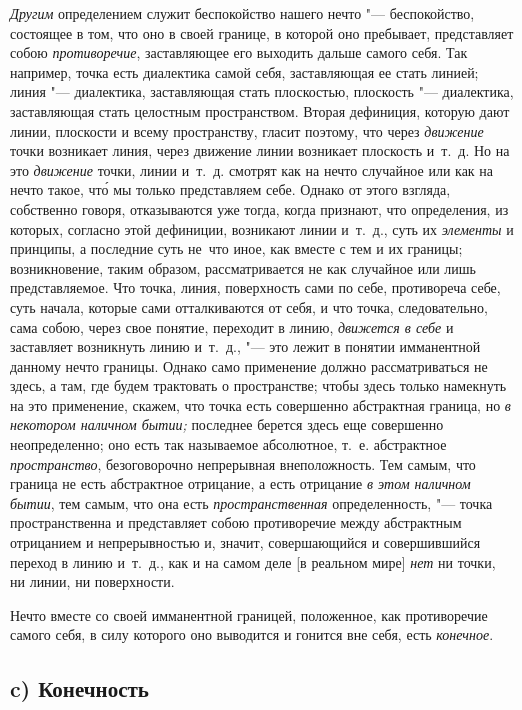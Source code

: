 {\em Другим} определением служит беспокойство нашего
нечто "--- беспокойство, состоящее в том, что оно в своей границе, в которой
оно пребывает, представляет собою {\em противоречие},
заставляющее его выходить дальше самого себя. Так например, точка есть
диалектика самой себя, заставляющая ее стать линией; линия "--- диалектика,
заставляющая стать плоскостью, плоскость "--- диалектика, заставляющая стать
целостным пространством. Вторая дефиниция, которую дают линии, плоскости и
всему пространству, гласит поэтому, что через
{\em движение} точки возникает линия, через движение
линии возникает плоскость и~т.~д. Но на это
{\em движение} точки, линии и~т.~д. смотрят как на
нечто случайное или как на нечто такое, чт\'{о} мы только представляем себе.
Однако от этого взгляда, собственно говоря, отказываются уже тогда, когда
признают, что определения, из которых, согласно этой дефиниции, возникают
линии и~т.~д., суть их {\em элементы} и принципы, а
последние суть не~что иное, как вместе с тем и их границы; возникновение,
таким образом, рассматривается не как случайное или лишь представляемое.
Что точка, линия, поверхность сами по себе, противореча себе, суть начала,
которые сами отталкиваются от себя, и что точка, следовательно, сама собою,
через свое понятие, переходит в линию, {\em движется в
себе} и заставляет возникнуть линию и~т.~д., "--- это лежит в понятии
имманентной данному нечто границы. Однако само применение должно
рассматриваться не здесь, а там, где будем трактовать о пространстве; чтобы
здесь только намекнуть на это применение, скажем, что точка есть совершенно
абстрактная граница, но {\em в некотором наличном
бытии;} последнее берется здесь еще совершенно неопределенно; оно есть так
называемое абсолютное, т.~е. абстрактное
{\em пространство}, безоговорочно непрерывная
внеположность. Тем самым, что граница не есть абстрактное отрицание, а есть
отрицание {\em в этом наличном бытии}, тем самым, что
она есть {\em пространственная} определенность, "--- точка
пространственна и представляет собою противоречие между абстрактным
отрицанием и непрерывностью и, значит, совершающийся и совершившийся
переход в линию и~т.~д., как и на самом деле [в реальном мире]
{\em нет} ни точки, ни линии, ни поверхности.

Нечто вместе со своей имманентной границей, положенное, как противоречие
самого себя, в силу которого оно выводится и гонится вне себя, есть
{\em конечное}.

\subsection[c) Конечность]{c) Конечность}

